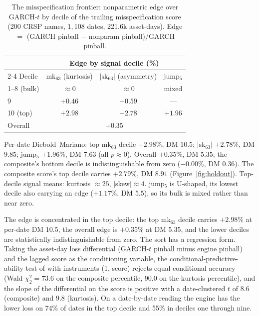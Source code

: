 \documentclass[11pt]{article}
\theoremstyle{remark}
\begin{document}
\begin{table}[t]
\centering
\begin{threeparttable}
\caption{The misspecification frontier: nonparametric edge over
GARCH-$t$ by decile of the trailing misspecification score (200 CRSP
names, $1{,}108$ dates, 221.6k asset-days). Edge $=$ (GARCH pinball $-$ nonparam
pinball)/GARCH pinball.}
\label{tab:frontier}
\begin{tabular}{lccc}
\toprule
& \multicolumn{3}{c}{Edge by signal decile (\%)} \\
\cmidrule(lr){2-4}
Decile & $\mathrm{mk}_{63}$ (kurtosis) & $|\mathrm{sk}_{63}|$ (asymmetry) & jump$_5$ \\
\midrule
1--8 (bulk) & $\approx 0$ & $\approx 0$ & mixed \\
9 & $+0.46$ & $+0.59$ & --- \\
10 (top) & $\mathbf{+2.98}$ & $\mathbf{+2.78}$ & $+1.96$ \\
\midrule
Overall & \multicolumn{3}{c}{$+0.35$} \\
\bottomrule
\end{tabular}
\begin{tablenotes}\footnotesize
\item Per-date Diebold--Mariano: top $\mathrm{mk}_{63}$ decile
$+2.98\%$, DM $10.5$; $|$sk$_{63}|$ $+2.78\%$, DM $9.85$; jump$_5$
$+1.96\%$, DM $7.63$ (all $p \approx 0$). Overall $+0.35\%$, DM $5.35$;
the composite's bottom decile is indistinguishable from zero ($-0.00\%$, DM $0.36$).
The composite score's top decile carries $+2.79\%$, DM $8.91$
(Figure~\ref{fig:holdout}). Top-decile signal means: kurtosis
$\approx 25$, $|$skew$| \approx 4$. jump$_5$ is U-shaped, its lowest
decile also carrying an edge ($+1.17\%$, DM $5.5$), so its bulk is mixed
rather than near zero.
\end{tablenotes}
\end{threeparttable}
\end{table}

The edge is concentrated in the top decile: the top $\mathrm{mk}_{63}$ decile
carries $+2.98\%$ at per-date DM $10.5$, the overall edge is $+0.35\%$ at
DM $5.35$, and the lower deciles are statistically indistinguishable
from zero. The sort has a regression form. Taking the asset-day loss differential (GARCH-$t$ pinball minus engine pinball) and the lagged score as the conditioning variable, the conditional-predictive-ability test of \citet{giacominiwhite2006} with instruments (1, score) rejects equal conditional accuracy (Wald $\chi^2_2=73.6$ on the composite percentile, 90.0 on the kurtosis percentile), and the slope of the differential on the score is positive with a date-clustered $t$ of 8.6 (composite) and 9.8 (kurtosis). On a date-by-date reading the engine has the lower loss on 74\% of dates in the top decile and 55\% in deciles one through nine.
\end{document}
